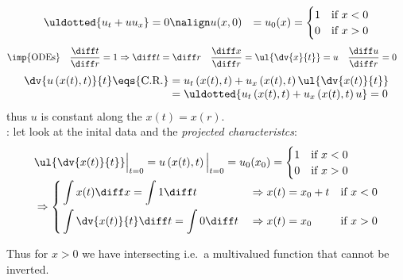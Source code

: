 \begin{examplebox}\nospacing
    \begin{example}\label{example:burgers_equation_riemann_problem}
        \begin{align*}
              \uldotted{u_t+u u_x}&=0 \nonumber\nalign
              u(x,0)&=u_{0}(x)=\begin{cases}
                    1&\text{if }x<0\\
                    0&\text{if }x>0
                    \end{cases}
        \end{align*}
        \begin{align*}
        &\imp{\text{ODEs}}&&\frac{\diff t}{\diff r}=1\Rightarrow \diff t=\diff r&&\frac{\diff x}{\diff r}=\ul{\dv{x}{t}}=u&&\frac{\diff u}{\diff r}=0
        \end{align*}
        \begin{align*}
          \dv{u\left(x(t),t\right)}{t}\eqs{\text{C.R.}}&=u_{t}\left(x(t),t\right)+u_{x}\left(x(t),t\right)\ul{\dv{x(t)}{t}} \\[-1\jot]
          &=\uldotted{u_{t}\left(x(t),t\right)+u_{x}\left(x(t),t\right)u}=0
        \end{align*}
        thus $u$ is constant along the  $x(t)=x(r)$.\\
        : let look at the inital data and the \textit{projected characteristcs}:
        \begin{align*}
          &\ul{\dv{x(t)}{t}}\Big|_{t=0}=u\left(x(t),t\right)\Big|_{t=0}=u_{0}(x_{0})=\begin{cases}1 &\text{if }x<0\\0&\text{if }x>0\end{cases}\\[-1\jot]
          &\Rightarrow\left\{\begin{aligned}
              &\int x(t)\diff x=\int 1\diff t&&\Rightarrow x(t)=x_{0}+t&&\text{if }x<0\\
              &\int\dv{x(t)}{t}\diff t=\int 0\diff t&&\Rightarrow x(t)=x_{0}&&\text{if }x>0
          \end{aligned}\right.
        \end{align*}
        \begin{figure}[H]
            \centering{
              \def\svgwidth{130pt}
              \resizebox{0.7\linewidth}{!}{}
            }
        \end{figure}
        Thus for $x>0$ we have intersecting  i.e.\ a multivalued function that cannot be inverted.
    \end{example}
\end{examplebox}
